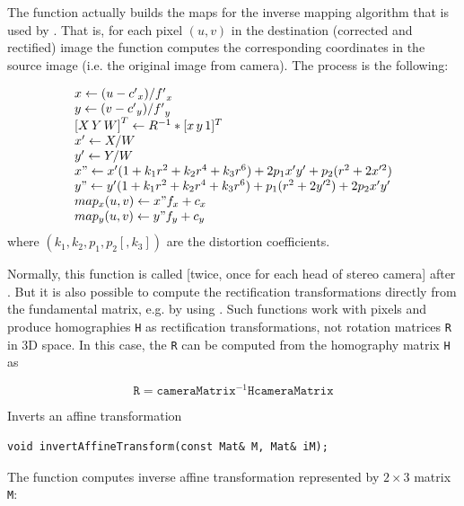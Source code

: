 The function actually builds the maps for the inverse mapping algorithm that is used by . That is, for each pixel $(u, v)$ in the destination (corrected and rectified) image the function computes the corresponding coordinates in the source image (i.e. the original image from camera). The process is the following:

\[
\begin{array}{l}
x \leftarrow (u - {c'}_x)/{f'}_x \\
y \leftarrow (v - {c'}_y)/{f'}_y \\
{[X\,Y\,W]}^T \leftarrow R^{-1}*[x\,y\,1]^T \\
x' \leftarrow X/W \\
y' \leftarrow Y/W \\
x" \leftarrow x' (1 + k_1 r^2 + k_2 r^4 + k_3 r^6) + 2p_1 x' y' + p_2(r^2 + 2 x'^2) \\
y" \leftarrow y' (1 + k_1 r^2 + k_2 r^4 + k_3 r^6) + p_1 (r^2 + 2 y'^2) + 2 p_2 x' y' \\
map_x(u,v) \leftarrow x" f_x + c_x \\
map_y(u,v) \leftarrow y" f_y + c_y
\end{array}
\]
where $(k_1, k_2, p_1, p_2[, k_3])$ are the distortion coefficients. 
 
Normally, this function is called [twice, once for each head of stereo camera] after . But it is also possible to compute the rectification transformations directly from the fundamental matrix, e.g. by using . Such functions work with pixels and produce homographies \texttt{H} as rectification transformations, not rotation matrices \texttt{R} in 3D space. In this case, the \texttt{R} can be computed from the homography matrix \texttt{H} as 

\[ \texttt{R} = \texttt{cameraMatrix}^{-1} \texttt{H} \texttt{cameraMatrix} \]

\label{invertAffineTransform}
Inverts an affine transformation

\begin{lstlisting}
void invertAffineTransform(const Mat& M, Mat& iM);
\end{lstlisting}
\begin{description}
\end{description}

The function computes inverse affine transformation represented by $2 \times 3$ matrix \texttt{M}:

